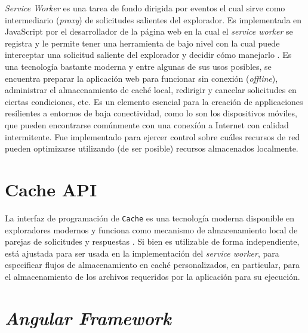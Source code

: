 \textit{Service Worker} es una tarea de fondo dirigida por eventos el cual sirve como intermediario (\textit{proxy}) de solicitudes salientes del explorador. Es implementada en JavaScript por el desarrollador de la página web en la cual el \textit{service worker} se registra y le permite tener una herramienta de bajo nivel con la cual puede interceptar una solicitud saliente del explorador y decidir cómo manejarlo \cite{serviceworker}. Es una tecnología bastante moderna y entre algunas de sus usos posibles, se encuentra preparar la aplicación web para funcionar sin conexión (\textit{offline}), administrar el almacenamiento de caché local, redirigir y cancelar solicitudes en ciertas condiciones, etc. Es un elemento esencial para la creación de applicaciones resilientes a entornos de baja conectividad, como lo son los dispositivos móviles, que pueden encontrarse comúnmente con una conexíón a Internet con calidad intermitente. Fue implementado para ejercer control sobre cuáles recursos de red pueden optimizarse utilizando (de ser posible) recursos almacenados localmente.

\section{Cache API}

La interfaz de programación de \texttt{Cache} es una tecnología moderna disponible en exploradores modernos y funciona como mecanismo de almacenamiento local de parejas de solicitudes y respuestas \cite{serviceworker}. Si bien es utilizable de forma independiente, está ajustada para ser usada en la implementación del \textit{service worker}, para especificar flujos de almacenamiento en caché personalizados, en particular, para el almacenamiento de los archivos requeridos por la aplicación para su ejecución.

\section{\textit{Angular Framework}}

